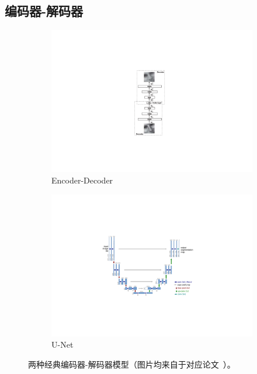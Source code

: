 \subsection{编码器-解码器}
\begin{figure}[h!] %
	\centering
	\begin{subfigure}{0.22\textwidth}
		\centering
		\includegraphics[width=1.0\textwidth]{figure/popular_encoder_decoder_original_encoder_encoder}
		\caption{Encoder-Decoder~\cite{hinton2006reducing}}
	\end{subfigure}
	\qquad
	\begin{subfigure}{0.71\textwidth}
		\centering
		\includegraphics[width=1.0\textwidth]{figure/popular_encoder_decoder_unet}
		\caption{U-Net~\cite{ronneberger2015u}}
		\label{subfig:popular_encoder_decoder_unet}
	\end{subfigure}
	\caption[两种经典编码器-解码器模型]{两种经典编码器-解码器模型（图片均来自于对应论文~\cite{hinton2006reducing, ronneberger2015u}）。} 
	\label{mulfig:popular_encoder_decoder}
\end{figure}

